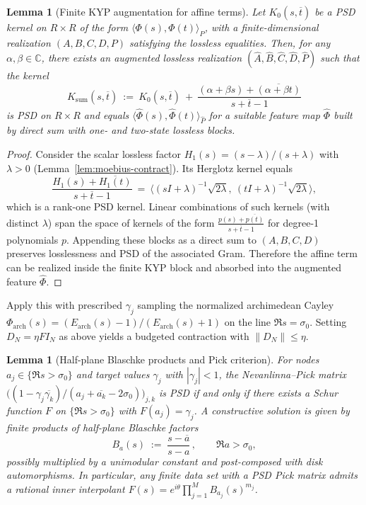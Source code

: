 \documentclass[11pt]{article}
\newtheorem{lemma}[theorem]{Lemma}
\theoremstyle{definition}
\theoremstyle{remark}
\newcommand{\C}{\mathbb{C}}
\begin{document}
\begin{lemma}[Finite KYP augmentation for affine terms]\label{lem:affine-gram}
Let \(K_0(s,\overline t)\) be a PSD kernel on \(R\times R\) of the form \(\langle \Phi(s),\Phi(t)\rangle_{P}\), with a finite-dimensional realization \((A,B,C,D,P)\) satisfying the lossless equalities. Then, for any \(\alpha,\beta\in\C\), there exists an augmented lossless realization \((\widehat A,\widehat B,\widehat C,\widehat D,\widehat P)\) such that the kernel
\[
 K_\mathrm{sum}(s,\overline t)\ :=\ K_0(s,\overline t)\ +\ \frac{(\alpha+\beta s)+\overline{(\alpha+\beta t)}}{s+\overline t -1}
\]
is PSD on \(R\times R\) and equals \(\langle \widehat\Phi(s),\widehat\Phi(t)\rangle_{\widehat P}\) for a suitable feature map \(\widehat\Phi\) built by direct sum with one- and two-state lossless blocks.
\end{lemma}
\begin{proof}
Consider the scalar lossless factor \(H_1(s)=(s-\lambda)/(s+\lambda)\) with \(\lambda>0\) (Lemma~\ref{lem:moebius-contract}). Its Herglotz kernel equals
\[\frac{H_1(s)+\overline{H_1(t)}}{s+\overline t -1}\ =\ \Big\langle (sI+\lambda)^{-1}\sqrt{2\lambda},\ (tI+\lambda)^{-1}\sqrt{2\lambda}\Big\rangle,\]
which is a rank-one PSD kernel. Linear combinations of such kernels (with distinct \(\lambda\)) span the space of kernels of the form \(\frac{p(s)+\overline{p(t)}}{s+\overline t-1}\) for degree-1 polynomials \(p\). Appending these blocks as a direct sum to \((A,B,C,D)\) preserves losslessness and PSD of the associated Gram. Therefore the affine term can be realized inside the finite KYP block and absorbed into the augmented feature \(\widehat\Phi\).
\end{proof}

Apply this with prescribed $\gamma_j$ sampling the normalized archimedean Cayley $\Phi_{\mathrm{arch}}(s)=(E_{\mathrm{arch}}(s)-1)/(E_{\mathrm{arch}}(s)+1)$ on the line $\Re s=\sigma_0$. Setting $D_N=\eta F I_N$ as above yields a budgeted contraction with $\|D_N\|\le \eta$.

\begin{lemma}[Half-plane Blaschke products and Pick criterion]\label{lem:halfplane-blaschke}
For nodes $a_j\in\{\Re s>\sigma_0\}$ and target values $\gamma_j$ with $|\gamma_j|<1$, the Nevanlinna--Pick matrix $\big((1-\gamma_j\overline{\gamma_k})/(a_j+\overline{a_k}-2\sigma_0)\big)_{j,k}$ is PSD if and only if there exists a Schur function $F$ on $\{\Re s>\sigma_0\}$ with $F(a_j)=\gamma_j$. A constructive solution is given by finite products of half-plane Blaschke factors
\[
 B_{a}(s)\;:=\;\frac{s-\overline a}{s-a}\,,\qquad \Re a>\sigma_0,
\]
possibly multiplied by a unimodular constant and post-composed with disk automorphisms. In particular, any finite data set with a PSD Pick matrix admits a rational inner interpolant $F(s)=e^{i\theta}\prod_{j=1}^{M} B_{a_j}(s)^{m_j}$.
\end{lemma}
\end{document}

